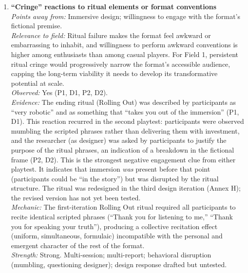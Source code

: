 \begin{enumerate}
\item \textbf{``Cringe'' reactions to ritual elements or format conventions}\\
\textit{Points away from:} Immersive design; willingness to engage with the format's fictional premise.\\
\textit{Relevance to field:} Ritual failure makes the format feel awkward or embarrassing to inhabit, and willingness to perform awkward conventions is higher among enthusiasts than among casual players. For Field 1, persistent ritual cringe would progressively narrow the format's accessible audience, capping the long-term viability it needs to develop its transformative potential at scale.\\
\textit{Observed:} Yes (P1, D1, P2, D2).\\
\textit{Evidence:} The ending ritual (Rolling Out) was described by participants as ``very robotic'' and as something that ``takes you out of the immersion'' (P1, D1). This reaction recurred in the second playtest: participants were observed mumbling the scripted phrases rather than delivering them with investment, and the researcher (as designer) was asked by participants to justify the purpose of the ritual phrases, an indication of a breakdown in the fictional frame (P2, D2). This is the strongest negative engagement clue from either playtest. It indicates that immersion \textit{was} present before that point (participants could be ``in the story'') but was disrupted by the ritual structure. The ritual was redesigned in the third design iteration (Annex H); the revised version has not yet been tested.\\
\textit{Mechanic:} The first-iteration Rolling Out ritual required all participants to recite identical scripted phrases (``Thank you for listening to me,'' ``Thank you for speaking your truth''), producing a collective recitation effect (uniform, simultaneous, formulaic) incompatible with the personal and emergent character of the rest of the format.\\
\textit{Strength:} Strong. Multi-session; multi-report; behavioral disruption (mumbling, questioning designer); design response drafted but untested.

\end{enumerate}

\bigskip


